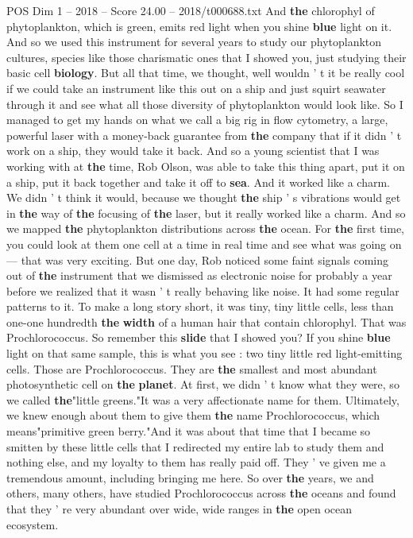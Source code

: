 \begin{textsample}{POS Dim 1 – 2018 – Score 24.00 – 2018/t000688.txt}
And \textbf{the} chlorophyl of phytoplankton, which is green, emits red light when you shine \textbf{blue} light on it.
And so we used this instrument for several years to study our phytoplankton cultures, species like those charismatic ones that I showed you, just studying their basic cell \textbf{biology}.
But all that time, we thought, well wouldn ' t it be really cool if we could take an instrument like this out on a ship and just squirt seawater through it and see what all those diversity of phytoplankton would look like.
So I managed to get my hands on what we call a big rig in flow cytometry, a large, powerful laser with a money-back guarantee from \textbf{the} company that if it didn ' t work on a ship, they would take it back.
And so a young scientist that I was working with at \textbf{the} time, Rob Olson, was able to take this thing apart, put it on a ship, put it back together and take it off to \textbf{sea}.
And it worked like a charm.
We didn ' t think it would, because we thought \textbf{the} ship ' s vibrations would get in \textbf{the} way of \textbf{the} focusing of \textbf{the} laser, but it really worked like a charm.
And so we mapped \textbf{the} phytoplankton distributions across \textbf{the} ocean.
For \textbf{the} first time, you could look at them one cell at a time in real time and see what was going on — that was very exciting.
But one day, Rob noticed some faint signals coming out of \textbf{the} instrument that we dismissed as electronic noise for probably a year before we realized that it wasn ' t really behaving like noise.
It had some regular patterns to it.
To make a long story short, it was tiny, tiny little cells, less than one-one hundredth \textbf{the} \textbf{width} of a human hair that contain chlorophyl.
That was Prochlorococcus.
So remember this \textbf{slide} that I showed you?
If you shine \textbf{blue} light on that same sample, this is what you see : two tiny little red light-emitting cells.
Those are Prochlorococcus.
They are \textbf{the} smallest and most abundant photosynthetic cell on \textbf{the} \textbf{planet}.
At first, we didn ' t know what they were, so we called \textbf{the}"little greens."It was a very affectionate name for them.
Ultimately, we knew enough about them to give them \textbf{the} name Prochlorococcus, which means"primitive green berry."And it was about that time that I became so smitten by these little cells that I redirected my entire lab to study them and nothing else, and my loyalty to them has really paid off.
They ' ve given me a tremendous amount, including bringing me here.
So over \textbf{the} years, we and others, many others, have studied Prochlorococcus across \textbf{the} oceans and found that they ' re very abundant over wide, wide ranges in \textbf{the} open ocean ecosystem.

\end{textsample}
